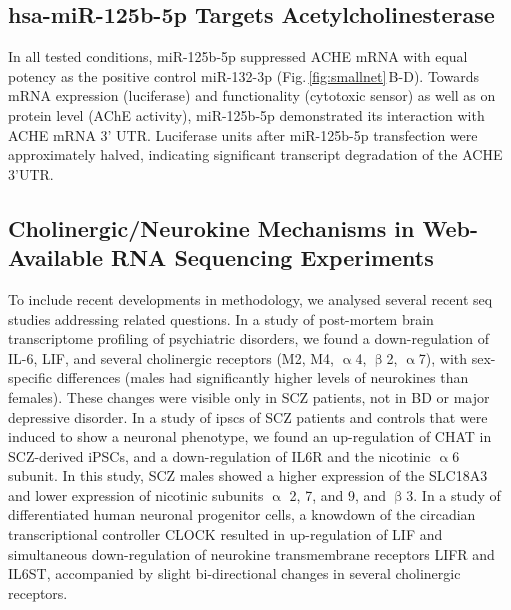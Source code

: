 \subsection{hsa-miR-125b-5p Targets Acetylcholinesterase}
In all tested conditions, miR-125b-5p suppressed ACHE mRNA with equal potency as the positive control miR-132-3p (Fig.\,\ref{fig:smallnet}\,B-D). Towards mRNA expression (luciferase) and functionality (cytotoxic sensor) as well as on protein level (AChE activity), miR-125b-5p demonstrated its interaction with ACHE mRNA 3' UTR. Luciferase units after miR-125b-5p transfection were approximately halved, indicating significant transcript degradation of the ACHE 3'UTR.

\subsection{Cholinergic/Neurokine Mechanisms in Web-Available RNA Sequencing Experiments}
To include recent developments in methodology, we analysed several recent \ac{seq} studies addressing related questions. In a study of post-mortem brain transcriptome profiling of psychiatric disorders\cite{Ramaker2017}, we found a down-regulation of IL-6, LIF, and several cholinergic receptors (M2, M4, $\upalpha$4, $\upbeta$2, $\upalpha$7), with sex-specific differences (males had significantly higher levels of neurokines than females). These changes were visible only in SCZ patients, not in BD or major depressive disorder. In a study of \acp{ipsc} of SCZ patients and controls that were induced to show a neuronal phenotype\cite{Hoffman2017}, we found an up-regulation of CHAT in SCZ-derived iPSCs, and a down-regulation of IL6R and the nicotinic $\upalpha$6 subunit. In this study, SCZ males showed a higher expression of the SLC18A3 and lower expression of nicotinic subunits $\upalpha$ 2, 7, and 9, and $\upbeta$3. In a study of differentiated human neuronal progenitor cells\cite{Fontenot2017}, a knowdown of the circadian transcriptional controller CLOCK resulted in up-regulation of LIF and simultaneous down-regulation of neurokine transmembrane receptors LIFR and IL6ST, accompanied by slight bi-directional changes in several cholinergic receptors.
